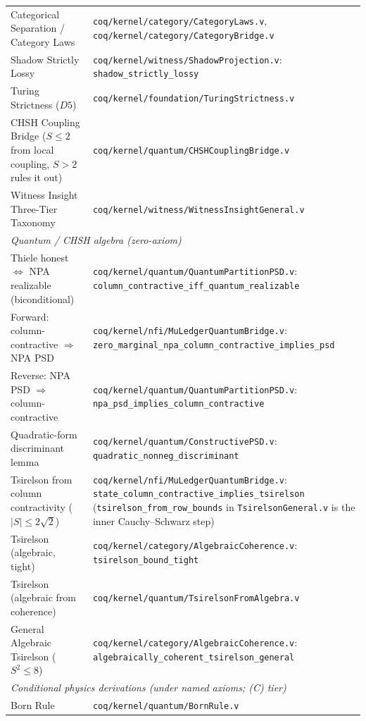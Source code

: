 \documentclass[11pt, a4paper]{report}
\theoremstyle{definition}
\theoremstyle{plain}
\begin{document}
\begin{center}
\begin{tabular}{ll}
\hline
Categorical Separation / Category Laws & \texttt{coq/kernel/category/CategoryLaws.v}, \texttt{coq/kernel/category/CategoryBridge.v} \\
Shadow Strictly Lossy & \texttt{coq/kernel/witness/ShadowProjection.v}: \texttt{shadow\_strictly\_lossy} \\
Turing Strictness ($D5$) & \texttt{coq/kernel/foundation/TuringStrictness.v} \\
CHSH Coupling Bridge ($S \le 2$ from local coupling, $S > 2$ rules it out) & \texttt{coq/kernel/quantum/CHSHCouplingBridge.v} \\
Witness Insight Three-Tier Taxonomy & \texttt{coq/kernel/witness/WitnessInsightGeneral.v} \\
\hline
\multicolumn{2}{l}{\emph{Quantum / CHSH algebra (zero-axiom)}} \\
\hline
Thiele honest $\iff$ NPA realizable (biconditional) & \texttt{coq/kernel/quantum/QuantumPartitionPSD.v}: \texttt{column\_contractive\_iff\_quantum\_realizable} \\
Forward: column-contractive $\Rightarrow$ NPA PSD & \texttt{coq/kernel/nfi/MuLedgerQuantumBridge.v}: \texttt{zero\_marginal\_npa\_column\_contractive\_implies\_psd} \\
Reverse: NPA PSD $\Rightarrow$ column-contractive & \texttt{coq/kernel/quantum/QuantumPartitionPSD.v}: \texttt{npa\_psd\_implies\_column\_contractive} \\
Quadratic-form discriminant lemma & \texttt{coq/kernel/quantum/ConstructivePSD.v}: \texttt{quadratic\_nonneg\_discriminant} \\
Tsirelson from column contractivity ($|S| \le 2\sqrt{2}$) & \texttt{coq/kernel/nfi/MuLedgerQuantumBridge.v}: \texttt{state\_column\_contractive\_implies\_tsirelson} (\texttt{tsirelson\_from\_row\_bounds} in \texttt{TsirelsonGeneral.v} is the inner Cauchy--Schwarz step) \\
Tsirelson (algebraic, tight) & \texttt{coq/kernel/category/AlgebraicCoherence.v}: \texttt{tsirelson\_bound\_tight} \\
Tsirelson (algebraic from coherence) & \texttt{coq/kernel/quantum/TsirelsonFromAlgebra.v} \\
General Algebraic Tsirelson ($S^2 \le 8$) & \texttt{coq/kernel/category/AlgebraicCoherence.v}: \texttt{algebraically\_coherent\_tsirelson\_general} \\
\hline
\multicolumn{2}{l}{\emph{Conditional physics derivations (under named axioms; (C) tier)}} \\
\hline
Born Rule & \texttt{coq/kernel/quantum/BornRule.v} \\

\end{tabular}
\end{center}
\end{document}

